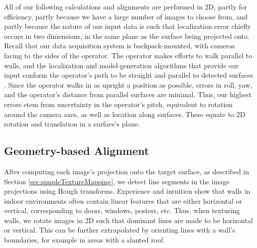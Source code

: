 \documentclass[]{spie}  %
\begin{document}
All of our following calculations and alignments are performed in 2D,
partly for efficiency, partly because we have a large number of images
to choose from, and partly because the nature of our input data is
such that localization error chiefly occurs in two dimensions, in the
same plane as the surface being projected onto. Recall that our data
acquisition system is backpack-mounted, with cameras facing to the
sides of the operator. The operator makes efforts to walk parallel to
walls, and the localization and model-generation algorithms that
provide our input conform the operator's path to be straight and
parallel to detected surfaces \cite{kua2012loopclosure,
  sanchez2012point}. Since the operator walks in as upright a position
as possible, errors in roll, yaw, and the operator's distance from
parallel surfaces are minimal. Thus, our highest errors stem from
uncertainty in the operator's pitch, equivalent to rotation around the
camera axes, as well as location along surfaces. These equate to 2D
rotation and translation in a surface's plane.

\subsection{Geometry-based Alignment}
\label{sec:geometryAlignment}
After computing each image's projection onto the target surface, as
described in Section \ref{sec:simpleTextureMapping}, we detect line
segments in the image projections using Hough transforms. Experience
and intuition show that walls in indoor environments often contain
linear features that are either horizontal or vertical, corresponding
to doors, windows, posters, etc. Thus, when texturing walls, we rotate
images in 2D such that dominant lines are made to be horizontal or
vertical. This can be further extrapolated by orienting lines with a
wall's boundaries, for example in areas with a slanted roof.
\end{document}
